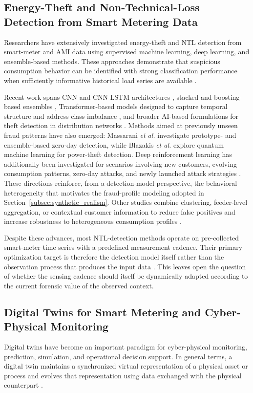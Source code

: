\documentclass{ieeeaccess}
\begin{document}
\subsection{Energy-Theft and Non-Technical-Loss Detection from Smart Metering Data}
Researchers have extensively investigated energy-theft and NTL detection from smart-meter and AMI data using supervised machine learning, deep learning, and ensemble-based methods. These approaches demonstrate that suspicious consumption behavior can be identified with strong classification performance when sufficiently informative historical load series are available \cite{b1,b2,b3,b4,b5,b6}.

Recent work spans CNN and CNN-LSTM architectures \cite{b2,b7}, stacked and boosting-based ensembles \cite{b4,b5,b8}, Transformer-based models designed to capture temporal structure and address class imbalance \cite{b9}, and broader AI-based formulations for theft detection in distribution networks \cite{b10,b11}. Methods aimed at previously unseen fraud patterns have also emerged: Massarani \textit{et al.} \cite{b6} investigate prototype- and ensemble-based zero-day detection, while Blazakis \textit{et al.} \cite{b12} explore quantum machine learning for power-theft detection. Deep reinforcement learning has additionally been investigated for scenarios involving new customers, evolving consumption patterns, zero-day attacks, and newly launched attack strategies \cite{b38}. These directions reinforce, from a detection-model perspective, the behavioral heterogeneity that motivates the fraud-profile modeling adopted in Section~\ref{subsec:synthetic_realism}. Other studies combine clustering, feeder-level aggregation, or contextual customer information to reduce false positives and increase robustness to heterogeneous consumption profiles \cite{b13,b14}.

Despite these advances, most NTL-detection methods operate on pre-collected smart-meter time series with a predefined measurement cadence. Their primary optimization target is therefore the detection model itself rather than the observation process that produces the input data \cite{b2,b5,b6}. This leaves open the question of whether the sensing cadence should itself be dynamically adapted according to the current forensic value of the observed context.

\subsection{Digital Twins for Smart Metering and Cyber-Physical Monitoring}
Digital twins have become an important paradigm for cyber-physical monitoring, prediction, simulation, and operational decision support. In general terms, a digital twin maintains a synchronized virtual representation of a physical asset or process and evolves that representation using data exchanged with the physical counterpart \cite{b15,b16,b17}.
\end{document}
